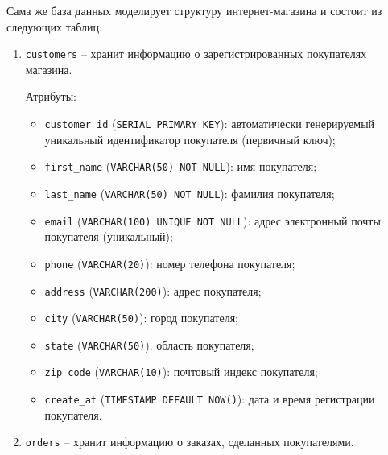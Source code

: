 \documentclass[master,paper]{pmk-graduate}
\begin{document}
Сама же база данных моделирует структуру интернет-магазина и состоит из следующих таблиц:
\begin{enumerate}
\item \texttt{customers} -- хранит информацию о зарегистрированных покупателях магазина.

Атрибуты:
\begin{itemize}
\item \texttt{customer\_id} (\texttt{SERIAL PRIMARY KEY}): автоматически генерируемый уникальный идентификатор покупателя (первичный ключ);
\item \texttt{first\_name} (\texttt{VARCHAR(50) NOT NULL}): имя покупателя;
\item \texttt{last\_name} (\texttt{VARCHAR(50) NOT NULL}): фамилия покупателя;
\item \texttt{email} (\texttt{VARCHAR(100) UNIQUE NOT NULL}): адрес электронный поч\-ты покупателя (уникальный);
\item \texttt{phone} (\texttt{VARCHAR(20)}): номер телефона покупателя;
\item \texttt{address} (\texttt{VARCHAR(200)}): адрес покупателя;
\item \texttt{city} (\texttt{VARCHAR(50)}): город покупателя;
\item \texttt{state} (\texttt{VARCHAR(50)}): область покупателя;
\item \texttt{zip\_code} (\texttt{VARCHAR(10)}): почтовый индекс покупателя;
\item \texttt{create\_at} (\texttt{TIMESTAMP DEFAULT NOW()}): дата и время регистрации покупателя.
\end{itemize}

\item \texttt{orders} -- хранит информацию о заказах, сделанных покупателями.


\end{enumerate}
\end{document}
